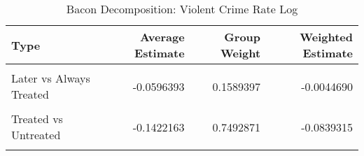 \begin{table}[H]

\caption{\label{tab:tab:bacondecompositionViolent}Bacon Decomposition: Violent Crime Rate Log}
\centering
\begin{tabular}[t]{lrrr}
\toprule
Type & Average Estimate & Group Weight & Weighted Estimate\\
\midrule
\cellcolor{gray!6}{Earlier vs Later Treated} & \cellcolor{gray!6}{0.1000224} & \cellcolor{gray!6}{0.0683810} & \cellcolor{gray!6}{0.0051705}\\
Later vs Always Treated & -0.0596393 & 0.1589397 & -0.0044690\\
\cellcolor{gray!6}{Later vs Earlier Treated} & \cellcolor{gray!6}{0.0208665} & \cellcolor{gray!6}{0.0233921} & \cellcolor{gray!6}{-0.0017883}\\
Treated vs Untreated & -0.1422163 & 0.7492871 & -0.0839315\\
\cellcolor{gray!6}{Total TWFE} & \cellcolor{gray!6}{NaN} & \cellcolor{gray!6}{NaN} & \cellcolor{gray!6}{-0.0850183}\\
\bottomrule
\end{tabular}
\end{table}
